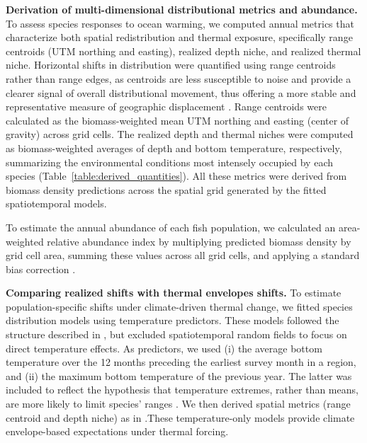 \documentclass[lineno,pdflatex,sn-nature]{sn-jnl}%
\begin{document}
\textbf{Derivation of multi-dimensional distributional metrics and abundance.} To assess species responses to ocean warming, we computed annual metrics that characterize both spatial redistribution and thermal exposure, specifically range centroids (UTM northing and easting), realized depth niche, and realized thermal niche. Horizontal shifts in distribution were quantified using range centroids rather than range edges, as centroids are less susceptible to noise and provide a clearer signal of overall distributional movement, thus offering a more stable and representative measure of geographic displacement \citep{shoo_detecting_2006}. Range centroids were calculated as the biomass-weighted mean UTM northing and easting (center of gravity) across grid cells. The realized depth and thermal niches were computed as biomass-weighted averages of depth and bottom temperature, respectively, summarizing the environmental conditions most intensely occupied by each species (Table~\ref{table:derived_quantities}). All these metrics were derived from biomass density predictions across the spatial grid generated by the fitted spatiotemporal models.

To estimate the annual abundance of each fish population, we calculated an area-weighted relative abundance index by multiplying predicted biomass density by grid cell area, summing these values across all grid cells, and applying a standard bias correction \citep{thorson_geostatistical_2015, thorsonImplementingGeneric2016}.

\textbf{Comparing realized shifts with thermal envelopes shifts.}
To estimate population-specific shifts under climate-driven thermal change, we fitted species distribution models using temperature predictors. These models followed the structure described in \textit{}, but excluded spatiotemporal random fields to focus on direct temperature effects. As predictors, we used (i) the average bottom temperature over the 12 months preceding the earliest survey month in a region, and (ii) the maximum bottom temperature of the previous year. The latter was included to reflect the hypothesis that temperature extremes, rather than means, are more likely to limit species’ ranges \citep{sunday_thermal_2019}. We then derived spatial metrics (range centroid and depth niche) as in \textit{}.These temperature-only models provide climate envelope-based expectations under thermal forcing.
\end{document}
